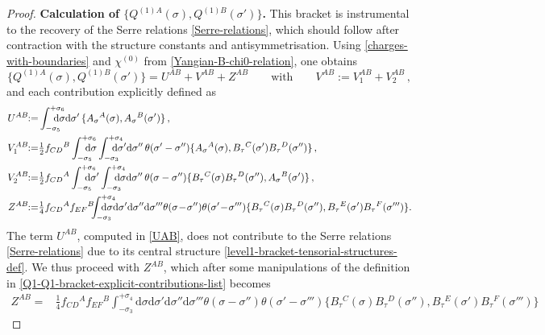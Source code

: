 \documentclass[12pt]{article}
\numberwithin{equation}{section}
\begin{document}
\begin{proof}
\textbf{Calculation of $\{Q^{(1)A}(\sigma),Q^{(1)B}(\sigma')\}$.} \quad 
This bracket is instrumental to the recovery of the Serre relations \eqref{Serre-relations}, which should follow after contraction with the structure constants and antisymmetrisation. Using \eqref{charges-with-boundaries} and $\chi^{(0)}$ from \eqref{Yangian-B-chi0-relation}, one obtains
\begin{equation}\label{Q1-Q1-bracket-contributions}
\{Q^{(1)A}(\sigma),Q^{(1)B}(\sigma')\}=U^{AB}+V^{AB}+Z^{AB}
\qquad \text{with} \qquad V^{AB}:=V_{1}^{AB}+V_{2}^{AB} \, ,
\end{equation}
and each contribution explicitly defined as
\begin{align}\label{Q1-Q1-bracket-explicit-contributions-list}
U^{AB}\!\!:=&\int_{-\sigma_{5}}^{+\sigma_{6}}\!\!\!\!\!\!\!\!\mathrm{d}\sigma\mathrm{d}\sigma' \, \{ A_{\sigma}{}^{A}(\sigma),A_{\sigma}{}^{B}(\sigma') \} \, ,
\\
V_{1}^{AB}\!\!:=&\tfrac{1}{2}f_{CD}{}^{B}\int_{-\sigma_{5}}^{+\sigma_{6}}\!\!\!\!\!\!\!\!\mathrm{d}\sigma \int_{-\sigma_{3}}^{+\sigma_{4}}\!\!\!\!\!\!\!\!\mathrm{d}\sigma'\mathrm{d}\sigma'' \, \theta(\sigma'-\sigma'')\{A_{\sigma}{}^{A}(\sigma),B_{\tau}{}^{C}(\sigma')B_{\tau}{}^{D}(\sigma'')\} \, ,
\notag\\
V_{2}^{AB}\!\!:=&\tfrac{1}{2}f_{CD}{}^{A}\int_{-\sigma_{5}}^{+\sigma_{6}}\!\!\!\!\!\!\!\!\mathrm{d}\sigma' \int_{-\sigma_{3}}^{+\sigma_{4}}\!\!\!\!\!\!\!\!\mathrm{d}\sigma\mathrm{d}\sigma'' \, \theta(\sigma-\sigma'')\{B_{\tau}{}^{C}(\sigma)B_{\tau}{}^{D}(\sigma''),A_{\sigma}{}^{B}(\sigma')\} \, ,
\notag\\
Z^{AB}\!\!:=&\tfrac{1}{4}f_{CD}{}^{A}f_{EF}{}^{B}\!\!\!\int_{-\sigma_{3}}^{+\sigma_{4}}\!\!\!\!\!\!\!\!\!\!\mathrm{d}\sigma\mathrm{d}\sigma' \mathrm{d}\sigma'' \mathrm{d}\sigma'''  \theta(\sigma\!-\!\sigma'')\theta(\sigma'\!-\!\sigma''')  \{B_{\tau}{}^{C}(\sigma)B_{\tau}{}^{D}(\sigma''),B_{\tau}{}^{E}(\sigma')B_{\tau}{}^{F}(\sigma''')\} .
\notag
\end{align}
The term $U^{AB}$, computed in \eqref{UAB}, does not contribute to the Serre relations \eqref{Serre-relations} due to its central structure \eqref{level1-bracket-tensorial-structures-def}. We thus proceed with $Z^{AB}$, which after some manipulations of the definition in \eqref{Q1-Q1-bracket-explicit-contributions-list} becomes
\begin{align}
Z^{AB}\!\!=&\tfrac{1}{4}f_{CD}{}^{A}f_{EF}{}^{B}\!\!\!\int_{-\sigma_{3}}^{+\sigma_{4}}\!\!\!\!\!\!\!\!\!\!\mathrm{d}\sigma\mathrm{d}\sigma' \mathrm{d}\sigma'' \mathrm{d}\sigma'''  \theta(\sigma\!-\!\sigma'')\theta(\sigma'\!-\!\sigma''')  \{B_{\tau}{}^{C}(\sigma)B_{\tau}{}^{D}(\sigma''),B_{\tau}{}^{E}(\sigma')B_{\tau}{}^{F}(\sigma''')\} 

\end{align}
\end{proof}
\end{document}
